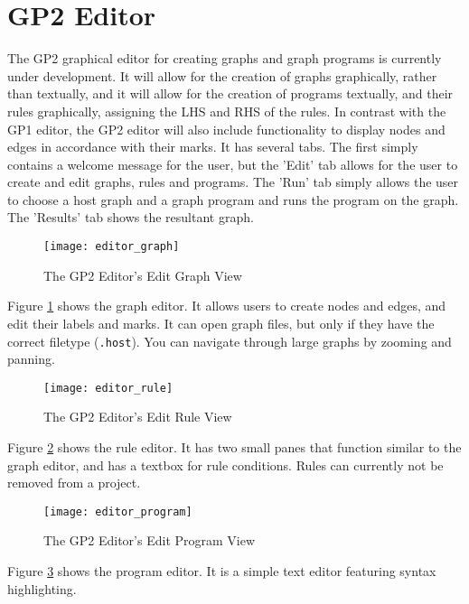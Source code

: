 \documentclass{UoYCSproject}
\begin{document}

\section{GP2 Editor}
The GP2 graphical editor for creating graphs and graph programs is currently under development. It will allow for the creation of graphs graphically, rather than textually, and it will allow for the creation of programs textually, and their rules graphically, assigning the LHS and RHS of the rules. In contrast with the GP1 editor, the GP2 editor will also include functionality to display nodes and edges in accordance with their marks. It has several tabs. The first simply contains a welcome message for the user, but the 'Edit' tab allows for the user to create and edit graphs, rules and programs. The 'Run' tab simply allows the user to choose a host graph and a graph program and runs the program on the graph. The 'Results' tab shows the resultant graph.

\begin{figure}
\label{img:editor_graph}
\texttt{[image: editor\_graph]}
\caption{The GP2 Editor's Edit Graph View}
\end{figure}

Figure \ref{img:editor_graph} shows the graph editor. It allows users to create nodes and edges, and edit their labels and marks. It can open graph files, but only if they have the correct filetype (\texttt{.host}). You can navigate through large graphs by zooming and panning.

\begin{figure}
\label{img:editor_rule}
\texttt{[image: editor\_rule]}
\caption{The GP2 Editor's Edit Rule View}
\end{figure}

Figure \ref{img:editor_rule} shows the rule editor. It has two small panes that function similar to the graph editor, and has a textbox for rule conditions. Rules can currently not be removed from a project.

\begin{figure}
\label{img:editor_program}
\texttt{[image: editor\_program]}
\caption{The GP2 Editor's Edit Program View}
\end{figure}

Figure \ref{img:editor_program} shows the program editor. It is a simple text editor featuring syntax highlighting.
\end{document}

